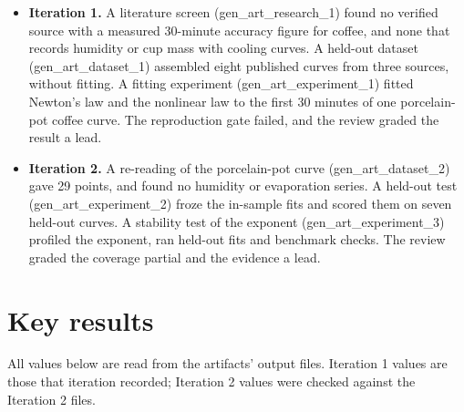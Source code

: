\documentclass[11pt,letterpaper]{article}
\begin{document}
\begin{itemize}
\item \textbf{Iteration 1.} A literature screen (gen\_art\_research\_1) found no verified source with a measured 30-minute accuracy figure for coffee, and none that records humidity or cup mass with cooling curves. A held-out dataset (gen\_art\_dataset\_1) assembled eight published curves from three sources, without fitting. A fitting experiment (gen\_art\_experiment\_1) fitted Newton's law and the nonlinear law to the first 30 minutes of one porcelain-pot coffee curve. The reproduction gate failed, and the review graded the result a lead.
\item \textbf{Iteration 2.} A re-reading of the porcelain-pot curve (gen\_art\_dataset\_2) gave 29 points, and found no humidity or evaporation series. A held-out test (gen\_art\_experiment\_2) froze the in-sample fits and scored them on seven held-out curves. A stability test of the exponent (gen\_art\_experiment\_3) profiled the exponent, ran held-out fits and benchmark checks. The review graded the coverage partial and the evidence a lead.
\end{itemize}

\section*{Key results}

All values below are read from the artifacts' output files. Iteration 1 values are those that iteration recorded; Iteration 2 values were checked against the Iteration 2 files.
\end{document}
